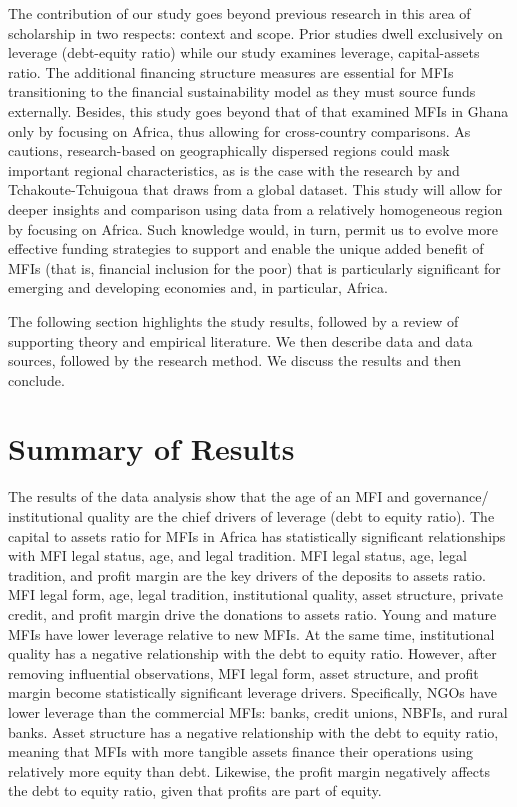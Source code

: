 \documentclass[a4paper, nobind]{templates/ociamthesis}
\begin{document}
The contribution of our study goes beyond previous research in this area of scholarship in two respects: context and scope. Prior studies dwell exclusively on leverage (debt-equity ratio) while our study examines leverage, capital-assets ratio. The additional financing structure measures are essential for MFIs transitioning to the financial sustainability model as they must source funds externally. Besides, this study goes beyond that of \textcite{kyereboah2007determinants} that examined MFIs in Ghana only by focusing on Africa, thus allowing for cross-country comparisons. As \textcite{d2017ngos} cautions, research-based on geographically dispersed regions could mask important regional characteristics, as is the case with the research by \textcite{tchuigoua2014institutional} and \textcite{tchuigoua2015capital} Tchakoute-Tchuigoua that draws from a global dataset. This study will allow for deeper insights and comparison using data from a relatively homogeneous region by focusing on Africa. Such knowledge would, in turn, permit us to evolve more effective funding strategies to support and enable the unique added benefit of MFIs (that is, financial inclusion for the poor) that is particularly significant for emerging and developing economies and, in particular, Africa.

The following section highlights the study results, followed by a review of supporting theory and empirical literature. We then describe data and data sources, followed by the research method. We discuss the results and then conclude.

\hypertarget{summary-of-results-3}{%
\section{Summary of Results}\label{summary-of-results-3}}

The results of the data analysis show that the age of an MFI and governance/ institutional quality are the chief drivers of leverage (debt to equity ratio). The capital to assets ratio for MFIs in Africa has statistically significant relationships with MFI legal status, age, and legal tradition. MFI legal status, age, legal tradition, and profit margin are the key drivers of the deposits to assets ratio. MFI legal form, age, legal tradition, institutional quality, asset structure, private credit, and profit margin drive the donations to assets ratio. Young and mature MFIs have lower leverage relative to new MFIs. At the same time, institutional quality has a negative relationship with the debt to equity ratio. However, after removing influential observations, MFI legal form, asset structure, and profit margin become statistically significant leverage drivers. Specifically, NGOs have lower leverage than the commercial MFIs: banks, credit unions, NBFIs, and rural banks. Asset structure has a negative relationship with the debt to equity ratio, meaning that MFIs with more tangible assets finance their operations using relatively more equity than debt. Likewise, the profit margin negatively affects the debt to equity ratio, given that profits are part of equity.
\end{document}
